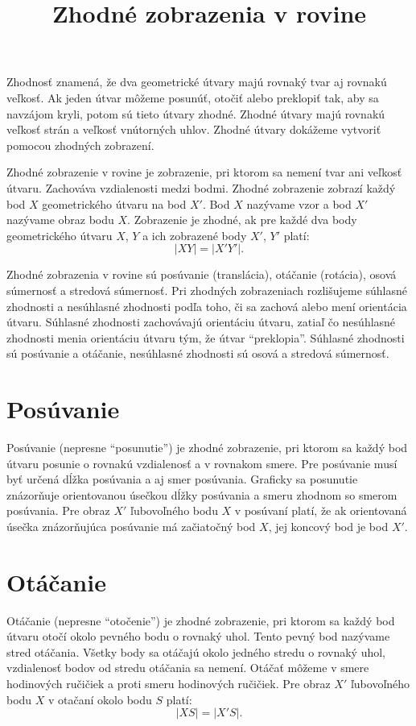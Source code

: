 \documentclass{article}
\title{Zhodné zobrazenia v rovine}
\begin{document}
\maketitle

Zhodnosť znamená, že dva geometrické útvary majú rovnaký tvar aj rovnakú veľkosť. Ak jeden útvar môžeme posunúť, otočiť alebo preklopiť tak, aby sa navzájom kryli, potom sú tieto útvary zhodné. Zhodné útvary majú rovnakú veľkosť strán a veľkosť vnútorných uhlov. Zhodné útvary dokážeme vytvoriť pomocou zhodných zobrazení.

Zhodné zobrazenie v rovine je zobrazenie, pri ktorom sa nemení tvar ani veľkosť útvaru. Zachováva vzdialenosti medzi bodmi. Zhodné zobrazenie zobrazí každý bod \(X\) geometrického útvaru na bod \(X'\). Bod \(X\) nazývame vzor a bod \(X'\) nazývame obraz bodu \(X\). Zobrazenie je zhodné, ak pre každé dva body geometrického útvaru \(X\), \(Y\) a ich zobrazené body \(X'\), \(Y'\) platí:
\[
|XY| = |X'Y'|.
\]

Zhodné zobrazenia v rovine sú posúvanie (translácia), otáčanie (rotácia), osová súmernosť a stredová súmernosť. Pri zhodných zobrazeniach rozlišujeme súhlasné zhodnosti a nesúhlasné zhodnosti podľa toho, či sa zachová alebo mení orientácia útvaru. Súhlasné zhodnosti zachovávajú orientáciu útvaru, zatiaľ čo nesúhlasné zhodnosti menia orientáciu útvaru tým, že útvar \enquote{preklopia}. Súhlasné zhodnosti sú posúvanie a otáčanie, nesúhlasné zhodnosti sú osová a stredová súmernosť.

\section{Posúvanie}

Posúvanie (nepresne \enquote{posunutie}) je zhodné zobrazenie, pri ktorom sa každý bod útvaru posunie o rovnakú vzdialenosť a v rovnakom smere. Pre posúvanie musí byť určená dĺžka posúvania a aj smer posúvania. Graficky sa posunutie znázorňuje orientovanou úsečkou dĺžky posúvania a smeru zhodnom so smerom posúvania. Pre obraz \(X'\) ľubovoľného bodu \(X\) v posúvaní platí, že ak orientovaná úsečka znázorňujúca posúvanie má začiatočný bod \(X\), jej koncový bod je bod \(X'\).

\section{Otáčanie}

Otáčanie (nepresne \enquote{otočenie}) je zhodné zobrazenie, pri ktorom sa každý bod útvaru otočí okolo pevného bodu o rovnaký uhol. Tento pevný bod nazývame stred otáčania. Všetky body sa otáčajú okolo jedného stredu o rovnaký uhol, vzdialenosť bodov od stredu otáčania sa nemení. Otáčať môžeme v smere hodinových ručičiek a proti smeru hodinových ručičiek. Pre obraz \(X'\) ľubovoľného bodu \(X\) v otačaní okolo bodu \(S\) platí:
\[
|XS| = |X'S|.
\]
\end{document}
